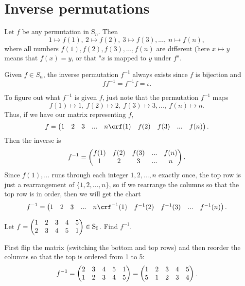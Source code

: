 \documentclass[11pt,dvipsnames]{book}
\numberwithin{equation}{section} %
\numberwithin{figure}{section} %
\numberwithin{table}{section} %
\begin{document}
\section{Inverse permutations}

Let $f$ be any permutation in $\mathrm{S}_n$.  Then
$$
1\mapsto f(1),\  2\mapsto f(2),\  3\mapsto f(3),  \ldots,\  n\mapsto f(n),%
$$
where all numbers $f(1), f(2), f(3),\ldots, f(n)$ are different (here $x\mapsto y$ means that $f(x)=y$, or that "$x$ is mapped to $y$ under $f$".

Given $f\in S_{n}$, the inverse permutation $f^{-1}$ always exists since $f$ is bijection and
$$
f f^{-1}=f^{-1} f=\iota.
$$

To figure out what $f^{-1}$ is given $f$, just note that the permutation $f^{-1}$ maps
$$
f(1)\mapsto 1,\  f(2)\mapsto 2,\  f(3)\mapsto 3,  \ldots,\  f(n)\mapsto n.%
$$
Thus, if we have our matrix representing $f$, 
\[
f=\left(\begin{matrix} %
1 & 2 & 3 & ... & n\cr%
f(1) & f(2) & f(3) & ... & f(n)\cr%
\end{matrix}\right).
\]
Then the inverse is 
\[
f^{-1}=\left(\begin{matrix} %
f(1) & f(2) & f(3) & ... & f(n)\cr%
1 & 2 & 3 & ... & n\cr%
\end{matrix}\right).
\]
Since $f(1),...$ runs through each integer $1,2,...,n$ exactly once, the top row is just a rearrangement of $\{1,2,...,n\}$, so if we rearrange the columns so that the top row is in order, then we will get the chart
\[
f^{-1}=\left(\begin{matrix} %
1 & 2 & 3 & ... & n\cr%
f^{-1}(1) & f^{-1}(2) & f^{-1}(3) & ... & f^{-1}(n)\cr%
\end{matrix}\right).
\]

\begin{example}  Let $f=\left(\begin{matrix} %
1 & 2 & 3 & 4 & 5\cr%
2 & 3 & 4 & 5 & 1\cr%
\end{matrix}\right)\in\mathrm{S}_5$.   Find $f^{-1}$.

First flip the matrix (switching the bottom and top rows) and then reorder the columns so that the top is ordered from 1 to 5:
\[
f^{-1} = \left(\begin{matrix} %
2 & 3 & 4 & 5 & 1\cr%
1 & 2 & 3 & 4 & 5\cr%
\end{matrix}\right)
=\left(\begin{matrix} %
1 & 2 & 3 & 4 & 5\cr%
5 & 1 & 2 & 3 & 4\cr%
\end{matrix}\right).
\]
\end{example}
\end{document}
